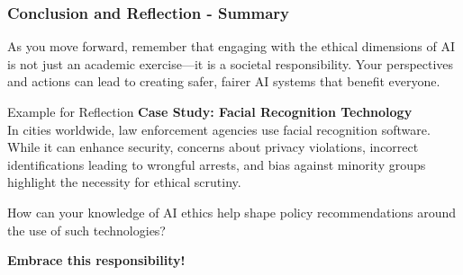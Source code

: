 \documentclass{beamer}
\begin{document}
\begin{frame}[fragile]
    \frametitle{Conclusion and Reflection - Summary}
    As you move forward, remember that engaging with the ethical dimensions of AI is not just an academic exercise—it is a societal responsibility. Your perspectives and actions can lead to creating safer, fairer AI systems that benefit everyone. 
    \begin{block}{Example for Reflection}
        \textbf{Case Study: Facial Recognition Technology} \\
        In cities worldwide, law enforcement agencies use facial recognition software. While it can enhance security, concerns about privacy violations, incorrect identifications leading to wrongful arrests, and bias against minority groups highlight the necessity for ethical scrutiny. 

        How can your knowledge of AI ethics help shape policy recommendations around the use of such technologies?
    \end{block}
    
    \textbf{Embrace this responsibility!}
\end{frame}
\end{document}
